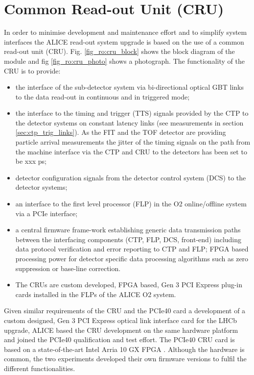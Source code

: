 



\section{Common Read-out Unit (CRU)}

In order to minimise development and maintenance effort and to simplify system interfaces the ALICE read-out system upgrade is based on the use of a common read-out unit (CRU). Fig.  \ref{fig_ro:cru_block}  shows the block diagram of the module and fig  \ref{fig_ro:cru_photo} shows a photograph. The functionality of the CRU is to provide: 
\begin{itemize}
\item the interface of the sub-detector system via bi-directional optical GBT links to the data read-out in continuous and in triggered mode;
\item the interface to the timing and trigger (TTS) signals provided by the CTP to the detector systems on constant latency links (see measurements in section \ref{sec:ctp_trig_links}). As the FIT and the TOF detector are providing particle arrival measurements the jitter of the timing signals on the path from the machine interface via the CTP and CRU to the detectors has been set to be xxx ps;
\item detector configuration signals from the detector control system (DCS) to the detector systems; 
\item an interface to the first level processor (FLP) in the O2 online/offline system via a PCIe interface;
\item a central firmware frame-work establishing generic data transmission paths between the interfacing components (CTP, FLP, DCS, front-end) including data protocol verification and error reporting to CTP and FLP;
FPGA based processing power for detector specific data processing algorithms such as zero suppression or base-line correction.
\item The CRUs are custom developed, FPGA based, Gen 3 PCI Express plug-in cards installed in the FLPs of the ALICE O2 system. 
\end {itemize} Given similar requirements of the CRU and the PCIe40 card  \cite{ro:PCI40} a development of a custom designed, Gen 3 PCI Express optical link interface card for the LHCb upgrade, ALICE based the CRU development on the same hardware platform and joined the PCIe40 qualification and test effort. The PCIe40 CRU card is based on a state-of-the-art Intel Arria 10 GX FPGA \cite{ro:CRU_FPGA}. Although the hardware is common, the two experiments developed their own firmware versions to fulfil the different functionalities. 

